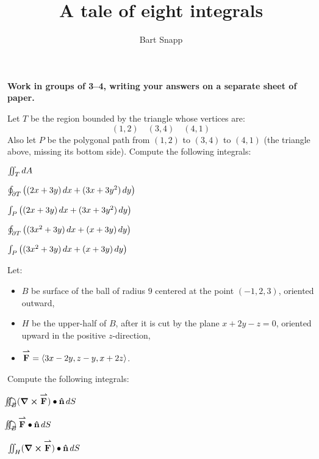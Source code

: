 \documentclass[nooutcomes,noauthor]{ximera}
\author{Bart Snapp}
\title[Collaborate:]{A tale of eight integrals}
\begin{document}
\begin{abstract}

\end{abstract}
\maketitle

\textbf{Work in groups of 3--4, writing your answers on a separate
  sheet of paper.}

Let $T$ be the region bounded by the triangle whose vertices are:
\[
(1,2)\quad (3,4)\quad (4,1)
\]
Also let $P$ be the polygonal path from $(1,2)$ to $(3,4)$ to $(4,1)$
(the triangle above, missing its bottom side).  Compute the following
integrals:
\begin{problem}
  $\iint_T \mathop{}\!d A$
\end{problem}

\begin{problem}
  $\oint_{\partial T} \left((2x+3y)\mathop{}\!d x + (3x+3y^2)\mathop{}\!d y\right)$
\end{problem}

\begin{problem}
  $\int_P \left((2x+3y)\mathop{}\!d x + (3x+3y^2)\mathop{}\!d y\right)$
\end{problem}

\begin{problem}
  $\oint_{\partial T} \left((3x^2+3y)\mathop{}\!d x + (x+3y)\mathop{}\!d y\right)$
\end{problem}

\begin{problem}
  $\int_P \left((3x^2+3y)\mathop{}\!d x + (x+3y)\mathop{}\!d y\right)$
\end{problem}

\newpage

Let:\vfil
\begin{itemize}[noitemsep,topsep=0pt]
\item $B$ be surface of the ball of radius $9$ centered at the point
  $(-1,2,3)$, oriented outward,
\item $H$ be the upper-half of $B$, after it is cut by the plane
  $x+2y-z =0$, oriented upward in the positive $z$-direction,
\item ${\overset{\boldsymbol{\rightharpoonup}}{\mathbf{F}}} = \left\langle 3x-2y,z-y,x+2z\right\rangle$.
\end{itemize}
Compute the following integrals:
\begin{problem}
  ${\large\bigcirc}\kern-1.56em\iint_B (\boldsymbol\nabla\boldsymbol\times{\overset{\boldsymbol{\rightharpoonup}}{\mathbf{F}}})\bullet\mathbf{\hat{n}}\mathop{}\!d S$
\end{problem}

\begin{problem}  
  ${\large\bigcirc}\kern-1.56em\iint_B {\overset{\boldsymbol{\rightharpoonup}}{\mathbf{F}}}\bullet\mathbf{\hat{n}}\mathop{}\!d S$
\end{problem}

\begin{problem}
  $\iint_H (\boldsymbol\nabla\boldsymbol\times{\overset{\boldsymbol{\rightharpoonup}}{\mathbf{F}}})\bullet\mathbf{\hat{n}}\mathop{}\!d S$
\end{problem}



\vfill
\end{document}
